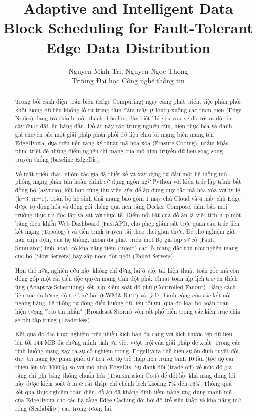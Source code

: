 \documentclass[11pt,a4paper]{article}
\title{Adaptive and Intelligent Data Block Scheduling for Fault-Tolerant Edge Data Distribution}
\author{Nguyen Minh Tri, Nguyen Ngoc Thong\\Trường Đại học Công nghệ thông tin}
\date{}
\begin{document}
\maketitle

\begin{abstract}
Trong bối cảnh điện toán biên (Edge Computing) ngày càng phát triển, việc phân phối khối lượng dữ liệu khổng lồ từ trung tâm đám mây (Cloud) xuống các trạm biên (Edge Nodes) đang trở thành một thách thức lớn, đặc biệt khi yêu cầu về độ trễ và độ tin cậy được đặt lên hàng đầu. Đồ án này tập trung nghiên cứu, hiện thực hóa và đánh giá chuyên sâu một giải pháp phân phối dữ liệu chịu lỗi mạng biên mang tên EdgeHydra, dựa trên nền tảng kỹ thuật mã hóa xóa (Erasure Coding), nhằm khắc phục triệt để những điểm nghẽn chí mạng của mô hình truyền dữ liệu song song truyền thống (baseline EdgeDis). 

Về mặt triển khai, nhóm tác giả đã thiết kế và xây dựng từ đầu một hệ thống mô phỏng mạng phân tán hoàn chỉnh sử dụng ngôn ngữ Python với kiến trúc lập trình bất đồng bộ (asyncio), kết hợp cùng thư viện \textit{zfec} để áp dụng quy tắc mã hóa xóa với tỷ lệ (k=3, m=1). Toàn bộ hệ sinh thái mạng bao gồm 1 máy chủ Cloud và 4 máy chủ Edge được tự động hóa và đóng gói thông qua nền tảng Docker Compose, đảm bảo môi trường thực thi độc lập và sát với thực tế. Điểm nổi bật của đồ án là việc tích hợp một bảng điều khiển Web Dashboard (FastAPI), cho phép giám sát trực quan cấu trúc liên kết mạng (Topology) và tiến trình truyền tải theo thời gian thực. Để thử nghiệm giới hạn chịu đựng của hệ thống, nhóm đã phát triển một Bộ giả lập sự cố (Fault Simulator) linh hoạt, có khả năng tiêm (inject) các lỗi mạng đặc thù như nghẽn mạng cục bộ (Slow Servers) hay sập node đột ngột (Failed Servers). 

Hơn thế nữa, nghiên cứu này không chỉ dừng lại ở việc tái hiện thuật toán gốc mà còn đóng góp một cải tiến độc quyền mang tính đột phá: Thuật toán lập lịch truyền thích ứng (Adaptive Scheduling) kết hợp kiểm soát độ phủ (Controlled Fanout). Bằng cách liên tục đo lường độ trễ khứ hồi (EWMA RTT) và tỷ lệ thành công của các kết nối ngang hàng, hệ thống tự động điều hướng dữ liệu tối ưu, qua đó loại bỏ hoàn toàn hiện tượng "bão tin nhắn" (Broadcast Storm) vốn rất phổ biến trong các kiến trúc chia sẻ phi tập trung (Leaderless).

Kết quả đo đạc thực nghiệm trên nhiều kịch bản đa dạng với kích thước tệp dữ liệu lên tới 144 MiB đã chứng minh tính ưu việt vượt trội của giải pháp đề xuất. Trong các tình huống mạng xảy ra sự cố nghiêm trọng, EdgeHydra thể hiện sự ổn định tuyệt đối, duy trì năng lực phân phối dữ liệu với độ trễ thấp hơn trung bình 10 lần (tốc độ cải thiện lên tới 1000\%) so với mô hình EdgeDis. Sự đánh đổi (trade-off) về mức độ gia tăng chi phí băng thông chuẩn hóa (Transmission Cost) để đổi lấy khả năng dung lỗi này được kiểm soát ở mức rất thấp, chỉ chênh lệch khoảng 7\% đến 16\%. Thông qua kết quả thực nghiệm toàn diện, đồ án đã khẳng định tiềm năng ứng dụng mạnh mẽ của EdgeHydra cho các hạ tầng Edge Caching đòi hỏi độ trễ siêu thấp và khả năng mở rộng (Scalability) cao trong tương lai.
\end{abstract}
\end{document}
